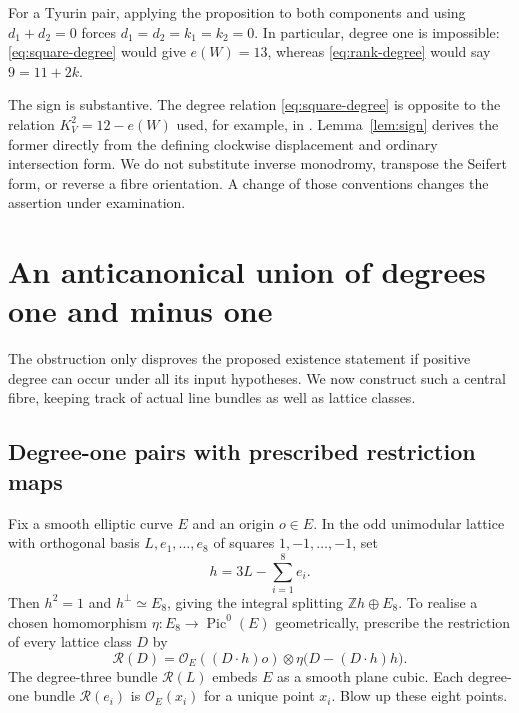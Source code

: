 \documentclass[11pt]{article}
\theoremstyle{definition}
\theoremstyle{remark}
\newcommand{\Z}{\mathbb Z}
\newcommand{\Pic}{\operatorname{Pic}}
\newcommand{\OO}{\mathcal O}
\begin{document}
For a Tyurin pair, applying the proposition to both components and using $d_1+d_2=0$ forces $d_1=d_2=k_1=k_2=0$. In particular, degree one is impossible: \eqref{eq:square-degree} would give $e(W)=13$, whereas \eqref{eq:rank-degree} would say $9=11+2k$.

The sign is substantive. The degree relation \eqref{eq:square-degree} is opposite to the relation $K_V^2=12-e(W)$ used, for example, in \cite[\S5.2.2]{GT}. Lemma~\ref{lem:sign} derives the former directly from the defining clockwise displacement and ordinary intersection form. We do not substitute inverse monodromy, transpose the Seifert form, or reverse a fibre orientation. A change of those conventions changes the assertion under examination.

\section{An anticanonical union of degrees one and minus one}

The obstruction only disproves the proposed existence statement if positive degree can occur under all its input hypotheses. We now construct such a central fibre, keeping track of actual line bundles as well as lattice classes.

\subsection{Degree-one pairs with prescribed restriction maps}
Fix a smooth elliptic curve $E$ and an origin $o\in E$. In the odd unimodular lattice with orthogonal basis $L,e_1,\ldots,e_8$ of squares $1,-1,\ldots,-1$, set
\[
h=3L-\sum_{i=1}^8e_i.
\]
Then $h^2=1$ and $h^\perp\simeq E_8$, giving the integral splitting $\Z h\oplus E_8$. To realise a chosen homomorphism $\eta:E_8\to\Pic^0(E)$ geometrically, prescribe the restriction of every lattice class $D$ by
\begin{equation}\label{eq:restriction}
\mathcal R(D)=\OO_E((D\cdot h)o)\otimes
\eta\bigl(D-(D\cdot h)h\bigr).
\end{equation}
The degree-three bundle $\mathcal R(L)$ embeds $E$ as a smooth plane cubic. Each degree-one bundle $\mathcal R(e_i)$ is $\OO_E(x_i)$ for a unique point $x_i$. Blow up these eight points.
\end{document}
